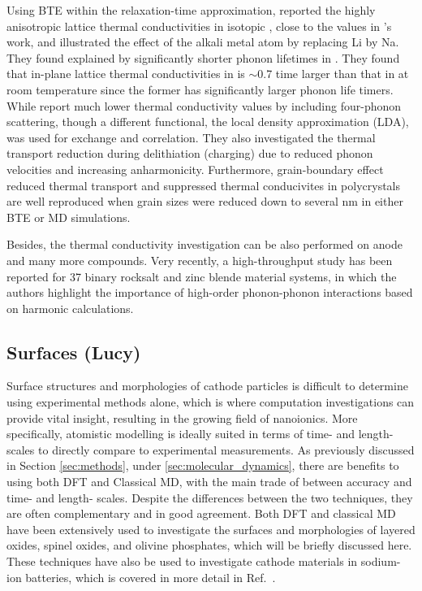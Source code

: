 \documentclass[../main.tex]{subfiles}
\begin{document}
Using BTE within the relaxation-time approximation, \citeauthor{mattila2020lattice} reported the highly anisotropic lattice thermal conductivities in isotopic , close to the values in \citeauthor{yang2019highly}'s work\cite{yang2019highly,yang2020chemical}, and illustrated the effect of the alkali metal atom by replacing Li by Na.\cite{mattila2020lattice} They found explained by significantly shorter phonon lifetimes in . They found that in-plane lattice thermal conductivities in  is $\sim$0.7 time larger than that in  at room temperature since the former has significantly larger phonon life timers. While \citeauthor{feng2020quantum} report much lower thermal conductivity values by including four-phonon scattering, though a different functional, the local density approximation (LDA), was used for exchange and correlation.\cite{feng2020quantum} They also investigated the thermal transport reduction during delithiation (charging) due to reduced phonon velocities and increasing anharmonicity. Furthermore, grain-boundary effect reduced thermal transport and  suppressed thermal conducivites in polycrystals are well reproduced when grain sizes were reduced down to several nm in either BTE or MD simulations. \cite{he2019thermal}

Besides, the thermal conductivity investigation can be also performed on anode and many more compounds.\cite{qian2016anisotropic, wei2018tunable} Very recently, a high-throughput study has been reported for 37 binary rocksalt and zinc blende material systems, in which the authors highlight the importance of high-order phonon-phonon interactions based on harmonic calculations. \cite{xia2020high}

\subsection{Surfaces (Lucy)}
Surface structures and morphologies of cathode particles is difficult to determine using experimental methods alone, which is where computation investigations can provide vital insight, resulting in the growing field of nanoionics. \cite{zhang2013nanomaterials} More specifically, atomistic modelling is ideally suited in terms of time- and length- scales to directly compare to experimental measurements. \cite{catlow2010modelling} As previously discussed in Section \ref{sec:methods}, under \ref{sec:molecular_dynamics}, there are benefits to using both DFT and Classical MD, with the main trade of between accuracy and time- and length- scales. Despite the differences between the two techniques, they are often complementary and in good agreement. Both DFT and classical MD have been extensively used to investigate the surfaces and morphologies of layered oxides, spinel oxides, and olivine phosphates, which will be briefly discussed here. These techniques have also be used to investigate cathode materials in sodium-ion batteries, which is covered in more detail in Ref.~.
\end{document}
